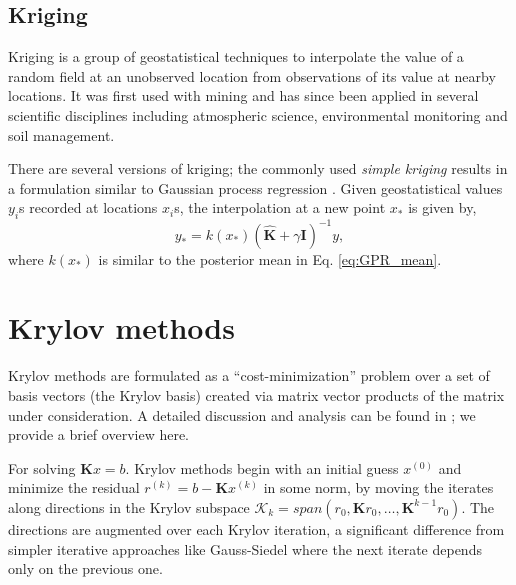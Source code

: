 \documentclass[10pt,journal,letterpaper,compsoc]{IEEEtran}
\begin{document}
\subsection{Kriging }
Kriging \cite{AppliedGeostatistics} is a group of geostatistical techniques to interpolate the value of a random field at an unobserved location from observations of its value at nearby locations. It was first used with mining and has since been applied in several scientific disciplines including atmospheric science, environmental monitoring and soil management.

There are several versions of kriging; the commonly used \emph{simple kriging} results in a formulation similar to Gaussian process regression \cite{AppliedGeostatistics}. Given geostatistical values $y_i$s recorded at locations $x_i$s, the interpolation at a new point $x_\ast$ is given by,
\begin{equation}y_\ast=k(x_\ast) (\mathbf{\hat{K}}+\gamma \mathbf{I})^{-1}y,\label{eq:Kriging}\end{equation}
where $k(x_\ast)$ is similar to the posterior mean in Eq. \ref{eq:GPR_mean}.

\section{Krylov methods \label{sec:Krylov}}
Krylov methods are formulated as a ``cost-minimization'' problem over a set of basis vectors (the Krylov basis) created via matrix vector products of the matrix under consideration. A detailed discussion and analysis can be found in \cite{SaadIterativeMethods,SaadEigen}; we provide a brief overview here.

For solving $\mathbf{K}x=b$. Krylov methods begin with an initial guess $x^{(0)}$ and minimize the residual $r^{(k)}=b-\mathbf{K}x^{(k)}$ in some norm, by moving the iterates along directions in the Krylov subspace $\mathcal{K}_k=span(r_0,\mathbf{K}r_0,\ldots,\mathbf{K}^{k-1}r_0)$. The directions are augmented over each Krylov iteration, a significant difference from simpler iterative approaches like Gauss-Siedel where the next iterate depends only on the previous one.
\end{document}
